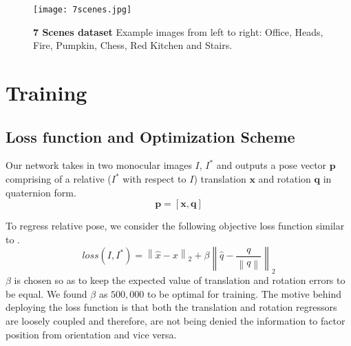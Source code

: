 \documentclass[usletter, 10 pt, conference]{ieeeconf}  %
\begin{document}
\begin{figure*}[t!]
\begin{center}
\texttt{[image: 7scenes.jpg]} \\
\caption{\textbf{7 Scenes dataset}
Example images from left to right: Office, Heads, Fire, Pumpkin, Chess, Red Kitchen and Stairs.}
\label{fig:sevensceneds1}
\end{center}
\vspace{-0.3cm}
\end{figure*}
\section{Training}

\subsection{Loss function and Optimization Scheme}
Our network takes in two monocular images $I$, $I^*$ and outputs a pose vector $\textbf{p}$ comprising of a relative ($I^*$ with respect to $I$) translation $\textbf{x}$ and rotation $\textbf{q}$ in quaternion form. 
\begin{equation}
\mathbf{p=[x,q]}
\end{equation}
 

To regress relative pose, we consider the following objective loss function similar to \cite{kendall2015posenet}.
\begin{equation}
loss(I,I^*)= \left \| \hat{x}-x \right \|_{2} +\beta  \left \| \hat{q}-\frac{q}{\left \| q \right \|} \right \|_{2}
\end{equation}
$\beta$ is chosen so as to keep the expected value of translation and rotation errors to be equal. We found $\beta$ as $500,000$ to be optimal for training. The motive behind deploying the loss function is that both the translation and rotation regressors are loosely coupled and therefore, are not being denied the information to factor position from orientation and vice versa.
\end{document}
